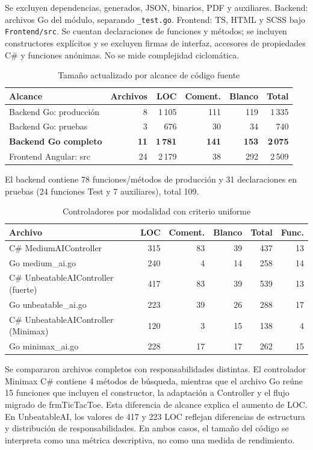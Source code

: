 \documentclass[12pt,a4paper]{article}
\begin{document}
Se excluyen dependencias, generados, JSON, binarios, PDF y auxiliares. Backend:
archivos Go del módulo, separando \texttt{\_test.go}. Frontend: TS, HTML y SCSS
bajo \texttt{Frontend/src}. Se cuentan declaraciones de funciones y métodos;
se incluyen constructores explícitos y se excluyen firmas de interfaz, accesores
de propiedades C\# y funciones anónimas. No se mide complejidad ciclomática.

\begin{table}[H]
\centering\small
\caption{Tamaño actualizado por alcance de código fuente}
\begin{tabular}{lrrrrr}
\toprule Alcance & Archivos & LOC & Coment. & Blanco & Total\\\midrule
Backend Go: producción & 8 & 1\,105 & 111 & 119 & 1\,335\\
Backend Go: pruebas & 3 & 676 & 30 & 34 & 740\\
\textbf{Backend Go completo} & \textbf{11} & \textbf{1\,781} & \textbf{141} & \textbf{153} & \textbf{2\,075}\\
Frontend Angular: src & 24 & 2\,179 & 38 & 292 & 2\,509\\
\bottomrule
\end{tabular}
\end{table}
El backend contiene 78 funciones/métodos de producción y 31 declaraciones en
pruebas (24 funciones Test y 7 auxiliares), total 109.

\begin{table}[H]
\centering\small
\caption{Controladores por modalidad con criterio uniforme}
\begin{tabular}{lrrrrr}
\toprule Archivo & LOC & Coment. & Blanco & Total & Func.\\\midrule
C\# MediumAIController & 315 & 83 & 39 & 437 & 13\\
Go medium\_ai.go & 240 & 4 & 14 & 258 & 14\\
C\# UnbeatableAIController (fuerte) & 417 & 83 & 39 & 539 & 13\\
Go unbeatable\_ai.go & 223 & 39 & 26 & 288 & 17\\
C\# UnbeatableAIController (Minimax) & 120 & 3 & 15 & 138 & 4\\
Go minimax\_ai.go & 228 & 17 & 17 & 262 & 15\\
\bottomrule
\end{tabular}
\end{table}
Se compararon archivos completos con responsabilidades distintas. El controlador
Minimax C\# contiene 4 métodos de búsqueda, mientras que el archivo Go reúne
15 funciones que incluyen el constructor, la adaptación a Controller y el flujo
migrado de frmTicTacToe. Esta diferencia de alcance explica el aumento de LOC.
En UnbeatableAI, los valores de 417 y 223 LOC reflejan diferencias de estructura
y distribución de responsabilidades. En ambos casos, el tamaño del código se
interpreta como una métrica descriptiva, no como una medida de rendimiento.
\end{document}
